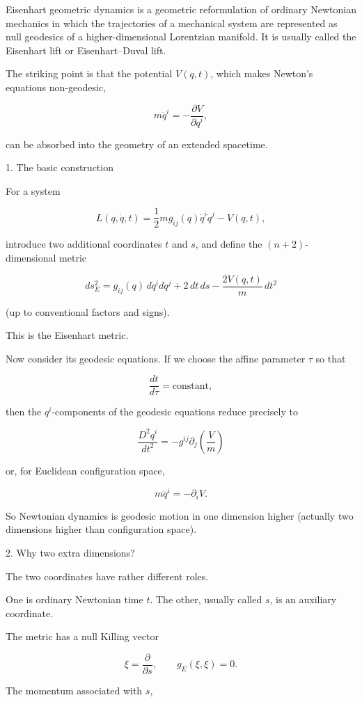 Eisenhart geometric dynamics is a geometric reformulation of ordinary Newtonian mechanics in which the trajectories of a mechanical system are represented as null geodesics of a higher-dimensional Lorentzian manifold. It is usually called the Eisenhart lift or Eisenhart–Duval lift.

The striking point is that the potential \(V(q,t)\), which makes Newton's equations non-geodesic,

$$ m\ddot q^i=-\frac{\partial V}{\partial q^i}, $$

can be absorbed into the geometry of an extended spacetime.

1. The basic construction

For a system

$$ L(q,\dot q,t) = \frac12 m g_{ij}(q)\dot q^i\dot q^j-V(q,t), $$

introduce two additional coordinates \(t\) and \(s\), and define the \((n+2)\)-dimensional metric

$$ \boxed{ ds_E^2 = g_{ij}(q)\,dq^i dq^j +2\,dt\,ds -\frac{2V(q,t)}{m}\,dt^2 } $$

(up to conventional factors and signs).

This is the Eisenhart metric.

Now consider its geodesic equations. If we choose the affine parameter \(\tau\) so that

$$ \frac{dt}{d\tau}=\text{constant}, $$

then the \(q^i\)-components of the geodesic equations reduce precisely to

$$ \boxed{ \frac{D^2q^i}{dt^2} = -g^{ij}\partial_j\!\left(\frac{V}{m}\right) } $$

or, for Euclidean configuration space,

$$ \boxed{ m\ddot q^i=-\partial_iV. } $$

So Newtonian dynamics is geodesic motion in one dimension higher (actually two dimensions higher than configuration space).

2. Why two extra dimensions?

The two coordinates have rather different roles.

One is ordinary Newtonian time \(t\). The other, usually called \(s\), is an auxiliary coordinate.

The metric has a null Killing vector

$$ \xi=\frac{\partial}{\partial s}, \qquad g_E(\xi,\xi)=0. $$

The momentum associated with \(s\),

